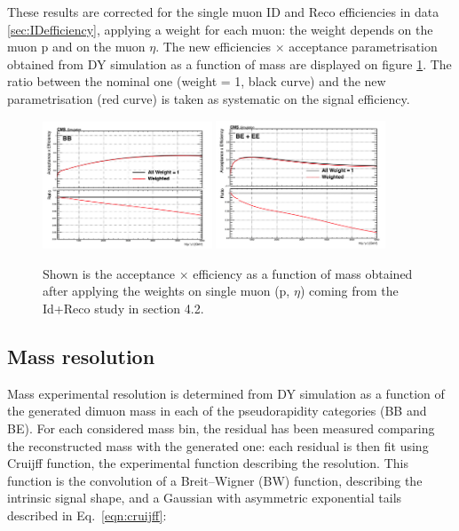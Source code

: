 These results are corrected for the single muon ID and Reco efficiencies in data \ref{sec:IDefficiency}, applying a weight for each muon: the weight depends on the muon p and on the muon $\eta$. The new efficiencies $\times$ acceptance parametrisation obtained from DY simulation as a function of mass are displayed on figure \ref{Effsys}. The ratio between the nominal one (weight = 1, black curve) and the new parametrisation (red curve) is taken as systematic on the signal efficiency. 

\begin{figure}[htbp]
\centering
\includegraphics[width=0.45\textwidth]{Images/Cap5/BarrelEffSysFinal}
\includegraphics[width=0.45\textwidth]{Images/Cap5/EndcapEffSysFinal}
\caption{Shown is the acceptance $\times$ efficiency as a function of mass obtained after applying the weights on single muon (p, $\eta$) coming from the Id+Reco study in section 4.2.}
\label{Effsys}
\end{figure}

\subsection{Mass resolution}
Mass experimental resolution is determined from DY simulation as a function of the generated dimuon mass in each of the pseudorapidity categories (BB and BE). For each considered mass bin, the residual has been measured comparing the reconstructed mass with the generated one: each residual is then fit using Cruijff function, the experimental function describing the resolution. This function is the convolution of a Breit--Wigner (BW) function, describing the intrinsic signal shape, and a Gaussian with asymmetric exponential tails described in Eq.~\ref{eqn:cruijff}:

